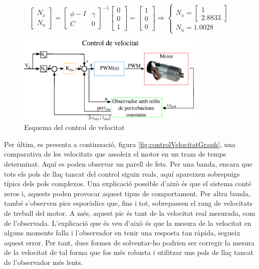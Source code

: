 \documentclass[12pt,a4paper,final,twoside,openright]{report}
\begin{document}
\begin{equation}\label{eq:Nx_Nu}
\begin{bmatrix}
N_x\\
N_u
\end{bmatrix}
=
\begin{bmatrix}
\phi - I & \gamma\\
C & 0
\end{bmatrix}^{-1}
\begin{bmatrix}
0\\
0\\
1
\end{bmatrix}
=
\begin{bmatrix}
1\\
0\\
0
\end{bmatrix}
\Rightarrow \left\{
\begin{array}{lr}
N_x = \begin{bmatrix}
1\\
2.8833
\end{bmatrix} \\
N_u = 1.0028
\end{array}
\right.
\end{equation}

\begin{figure}[h]
\centering
\includegraphics[width=0.8\textwidth]{Imatges/controlVelocitat.eps}
\caption{Esquema del control de velocitat\label{fig:controlVelocitat}}
\end{figure}

\newpage
Per últim, es presenta a continuació, figura \ref{fig:controlVelocitatGraph}, una comparativa de les velocitats que assoleix el motor en un tram de temps determinat. Aquí es poden observar un parell de fets. Per una banda, encara que tots els pols de llaç tancat del control siguin reals, aquí apareixen sobrepuigs típics dels pols complexos. Una explicació possible d'això és que el sistema conté zeros i, aquests poden provocar aquest tipus de comportament. Per altra banda, també s'observen pics esporàdics que, fins i tot, sobrepassen el rang de velocitats de treball del motor. A més, aquest pic és tant de la velocitat real mesurada, com de l'observada. L'explicació que és veu d'això és que la mesura de la velocitat en alguns moments falla i l'observador en tenir una resposta tan ràpida, segueix aquest error. Per tant, dues formes de solventar-ho podrien ser corregir la mesura de la velocitat de tal forma que fos més robusta i utilitzar uns pols de llaç tancat de l'observador més lents.
\end{document}
